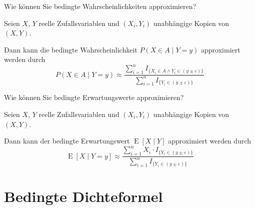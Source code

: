 \begin{QandA}
    \item Wie können Sie bedingte Wahrscheinlichkeiten approximieren?
    \begin{answered}
        Seien $X$, $Y$ reelle Zufallsvariablen und $(X_i, Y_i)$ unabhängige Kopien von $(X, Y)$.

        Dann kann die bedingte Wahrscheinlichkeit $P(X \in A \mid Y = y)$ approximiert werden durch
        \[
            P(X \in A \mid Y = y) \approx \frac{\sum_{i=1}^{n} I_{\{X_i \in A \land Y_i \in (y \pm \varepsilon)\}}}{\sum_{i=1}^{n} I_{\{Y_i \in (y \pm \varepsilon)\}}}
        \]
    \end{answered}

    \item Wie können Sie bedingte Erwartungswerte approximieren?
    \begin{answered}
        Seien $X$, $Y$ reelle Zufallsvariablen und $(X_i, Y_i)$ unabhängige Kopien von $(X, Y)$.

        Dann kann der bedingte Erwartungswert $\operatorname{E}[X \mid Y]$ approximiert werden durch
        \[
            \operatorname{E} [X \mid Y = y] \approx \frac{\sum_{i=1}^{n} X_i \cdot I_{\{Y_i \in (y \pm \varepsilon)\}}}{\sum_{i=1}^{n} I_{\{Y_i \in (y \pm \varepsilon)\}}}
        \]
    \end{answered}
\end{QandA}

\newpage
\section*{Bedingte Dichteformel}

